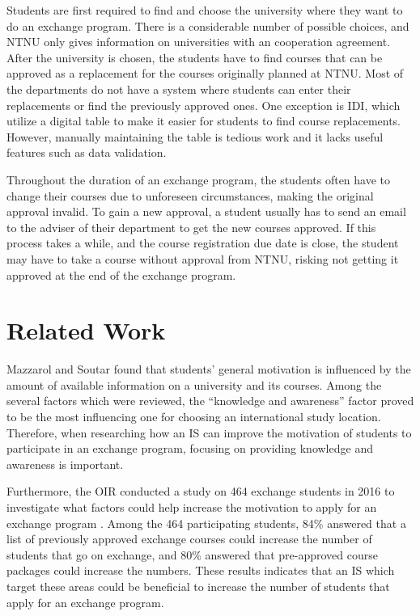 
Students are first required to find and choose the university where they want to do an exchange program. There is a considerable number of possible choices, and NTNU only gives information on universities with an cooperation agreement. After the university is chosen, the students have to find courses that can be approved as a replacement for the courses originally planned at NTNU. Most of the departments do not have a system where students can enter their replacements or find the previously approved ones. One exception is IDI, which utilize a digital table to make it easier for students to find course replacements. However, manually maintaining the table is tedious work and it lacks useful features such as data validation. 

Throughout the duration of an exchange program, the students often have to change their courses due to unforeseen circumstances, making the original approval invalid. To gain a new approval, a student usually has to send an email to the adviser of their department to get the new courses approved. If this process takes a while, and the course registration due date is close, the student may have to take a course without approval from NTNU, risking not getting it approved at the end of the exchange program.

\section{Related Work} \label{related_work}

Mazzarol and Soutar \cite{mazzarol2002push} found that students' general motivation is influenced by the amount of available information on a university and its courses. Among the several factors which were reviewed, the \enquote{knowledge and awareness} factor proved to be the most influencing one for choosing an international study location. Therefore, when researching how an IS can improve the motivation of students to participate in an exchange program, focusing on providing knowledge and awareness is important. 

Furthermore, the OIR conducted a study on 464 exchange students in 2016 to investigate what factors could help increase the motivation to apply for an exchange program \cite{intersek_report}. Among the 464 participating students, 84\% answered that a list of previously approved exchange courses could increase the number of students that go on exchange, and 80\% answered that pre-approved course packages could increase the numbers. These results indicates that an IS which target these areas could be beneficial to increase the number of students that apply for an exchange program.

